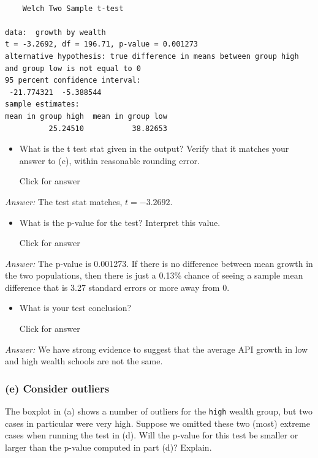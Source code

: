 \documentclass[
]{book}
\providecommand{\tightlist}{%
  \setlength{\itemsep}{0pt}\setlength{\parskip}{0pt}}
\begin{document}
\begin{verbatim}

    Welch Two Sample t-test

data:  growth by wealth
t = -3.2692, df = 196.71, p-value = 0.001273
alternative hypothesis: true difference in means between group high and group low is not equal to 0
95 percent confidence interval:
 -21.774321  -5.388544
sample estimates:
mean in group high  mean in group low 
          25.24510           38.82653 
\end{verbatim}

\begin{itemize}
\tightlist
\item
  What is the t test stat given in the output? Verify that it matches your answer to (c), within reasonable rounding error.

  Click for answer
\end{itemize}

\emph{Answer:} The test stat matches, \(t = -3.2692\).

\begin{itemize}
\tightlist
\item
  What is the p-value for the test? Interpret this value.

  Click for answer
\end{itemize}

\emph{Answer:} The p-value is 0.001273. If there is no difference between mean growth in the two populations, then there is just a 0.13\% chance of seeing a sample mean difference that is 3.27 standard errors or more away from 0.

\begin{itemize}
\tightlist
\item
  What is your test conclusion?

  Click for answer
\end{itemize}

\emph{Answer:} We have strong evidence to suggest that the average API growth in low and high wealth schools are not the same.

\hypertarget{e-consider-outliers}{%
\subsubsection{(e) Consider outliers}\label{e-consider-outliers}}

The boxplot in (a) shows a number of outliers for the \texttt{high} wealth group, but two cases in particular were very high. Suppose we omitted these two (most) extreme cases when running the test in (d). Will the p-value for this test be smaller or larger than the p-value computed in part (d)? Explain.
\end{document}

